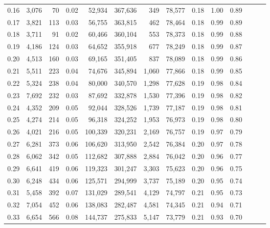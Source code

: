 \begin{tabular}{rrrrrrrrrrrrrr}
0.16 &   3,076 &     70 &  0.02 &   52,934 &  367,636 &     349 &  78,577 &  0.18 &  1.00 &      0.89 \\
0.17 &   3,821 &    113 &  0.03 &   56,755 &  363,815 &     462 &  78,464 &  0.18 &  0.99 &      0.89 \\
0.18 &   3,711 &     91 &  0.02 &   60,466 &  360,104 &     553 &  78,373 &  0.18 &  0.99 &      0.88 \\
0.19 &   4,186 &    124 &  0.03 &   64,652 &  355,918 &     677 &  78,249 &  0.18 &  0.99 &      0.87 \\
0.20 &   4,513 &    160 &  0.03 &   69,165 &  351,405 &     837 &  78,089 &  0.18 &  0.99 &      0.86 \\
0.21 &   5,511 &    223 &  0.04 &   74,676 &  345,894 &   1,060 &  77,866 &  0.18 &  0.99 &      0.85 \\
0.22 &   5,324 &    238 &  0.04 &   80,000 &  340,570 &   1,298 &  77,628 &  0.19 &  0.98 &      0.84 \\
0.23 &   7,692 &    232 &  0.03 &   87,692 &  332,878 &   1,530 &  77,396 &  0.19 &  0.98 &      0.82 \\
0.24 &   4,352 &    209 &  0.05 &   92,044 &  328,526 &   1,739 &  77,187 &  0.19 &  0.98 &      0.81 \\
0.25 &   4,274 &    214 &  0.05 &   96,318 &  324,252 &   1,953 &  76,973 &  0.19 &  0.98 &      0.80 \\
0.26 &   4,021 &    216 &  0.05 &  100,339 &  320,231 &   2,169 &  76,757 &  0.19 &  0.97 &      0.79 \\
0.27 &   6,281 &    373 &  0.06 &  106,620 &  313,950 &   2,542 &  76,384 &  0.20 &  0.97 &      0.78 \\
0.28 &   6,062 &    342 &  0.05 &  112,682 &  307,888 &   2,884 &  76,042 &  0.20 &  0.96 &      0.77 \\
0.29 &   6,641 &    419 &  0.06 &  119,323 &  301,247 &   3,303 &  75,623 &  0.20 &  0.96 &      0.75 \\
0.30 &   6,248 &    434 &  0.06 &  125,571 &  294,999 &   3,737 &  75,189 &  0.20 &  0.95 &      0.74 \\
0.31 &   5,458 &    392 &  0.07 &  131,029 &  289,541 &   4,129 &  74,797 &  0.21 &  0.95 &      0.73 \\
0.32 &   7,054 &    452 &  0.06 &  138,083 &  282,487 &   4,581 &  74,345 &  0.21 &  0.94 &      0.71 \\
0.33 &   6,654 &    566 &  0.08 &  144,737 &  275,833 &   5,147 &  73,779 &  0.21 &  0.93 &      0.70 \\

\end{tabular}
